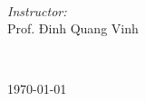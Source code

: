\begin{titlepage}
\begin{minipage}{0.5\textwidth}
\begin{flushleft}
\end{flushleft}
\end{minipage}
~
\begin{minipage}{0.4\textwidth}
\begin{flushright} \large
\emph{Instructor:} \\
Prof. Đinh Quang Vinh\\[1.2em] 
\end{flushright}
\end{minipage}\\[2cm]
\makeatother


{\large \today}\\[2cm] %

\vfill %

\end{titlepage}